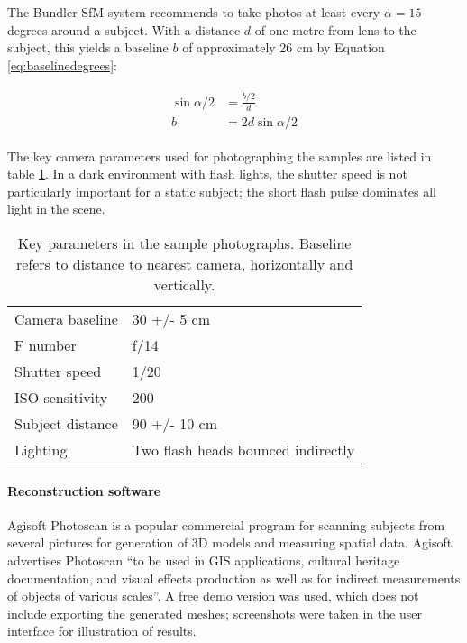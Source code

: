 The Bundler SfM system recommends to take photos at least every $\alpha = 15$ degrees around a subject.
With a distance $d$ of one metre from lens to the subject, this yields a baseline $b$ of approximately 26 cm by Equation \ref{eq:baselinedegrees}:

\begin{align} \begin{split} \label{eq:baselinedegrees}
	\sin \alpha/2 &= \frac{b/2}{d}\\
	b &= 2 d \sin \alpha/2
\end{split} \end{align}

The key camera parameters used for photographing the samples are listed in table \ref{tab:sampleshotparams}.
In a dark environment with flash lights, the shutter speed is not particularly important for a static subject; the short flash pulse dominates all light in the scene.

\begin{table}[h]
	\centering
	\begin{tabular}{l l}
		Camera baseline & 30 +/- 5 cm\\
		F number & f/14\\
		Shutter speed & 1/20\\
		ISO sensitivity & 200\\
		Subject distance & 90 +/- 10 cm\\
		Lighting & Two flash heads bounced indirectly\\
	\end{tabular}
	\caption{
		Key parameters in the sample photographs.
		Baseline refers to distance to nearest camera, horizontally and vertically.
	}
	\label{tab:sampleshotparams}
\end{table}



\paragraph{Reconstruction software}
Agisoft Photoscan is a popular commercial program for scanning subjects from several pictures for generation of 3D models and measuring spatial data.
Agisoft advertises Photoscan ``to be used in GIS applications, cultural heritage documentation, and visual effects production as well as for indirect measurements of objects of various scales''. \cite{photoscan}
A free demo version was used, which does not include exporting the generated meshes; screenshots were taken in the user interface for illustration of results.

